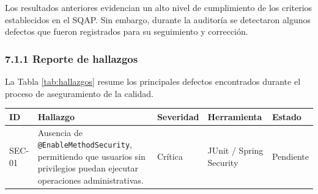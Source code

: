 Los resultados anteriores evidencian un alto nivel de cumplimiento de los criterios establecidos en el SQAP. Sin embargo, durante la auditoría se detectaron algunos defectos que fueron registrados para su seguimiento y corrección.

\subsubsection{7.1.1 Reporte de hallazgos}

La Tabla \ref{tab:hallazgos} resume los principales defectos encontrados durante el proceso de aseguramiento de la calidad.

\begin{table}[H]
    \centering
    \scriptsize
    \begin{tabular}{|p{1.5cm}|p{5.8cm}|p{2cm}|p{2.8cm}|p{2cm}|}
        \hline
        \textbf{ID}                                                                                                                                              &
        \textbf{Hallazgo}                                                                                                                                        &
        \textbf{Severidad}                                                                                                                                       &
        \textbf{Herramienta}                                                                                                                                     &
        \textbf{Estado}                                                                                                                                            \\
        \hline

        SEC-01                                                                                                                                                   &
        Ausencia de \texttt{@EnableMethodSecurity}, permitiendo que usuarios sin privilegios puedan ejecutar operaciones administrativas.                        &
        Crítica                                                                                                                                                  &
        JUnit / Spring Security                                                                                                                                  &
        Pendiente                                                                                                                                                  \\
        \hline


\end{tabular}
\end{table}
